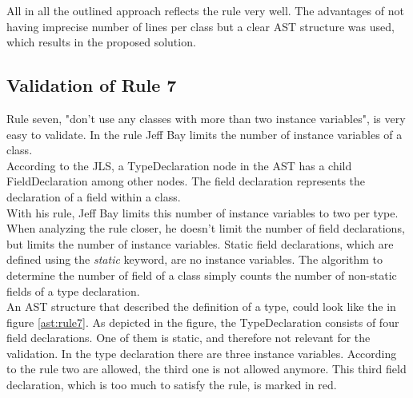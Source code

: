 All in all the outlined approach reflects the rule very well. The advantages of not having imprecise number of lines per class but a clear \acf{AST} structure was used, which results in the proposed solution.

\subsection*{Validation of Rule 7}
Rule seven, "don’t use any classes with more than two instance variables", is very easy to validate. In the rule Jeff Bay limits the number of instance variables of a class. 
\\

According to the \acf{JLS}, a TypeDeclaration node in the \acf{AST} has  a child FieldDeclaration among other nodes. The field declaration represents the declaration of a field within a class. 
\\

With his rule, Jeff Bay limits this number of instance variables to two per type. When analyzing the rule closer, he doesn't limit the number of field declarations, but limits the number of instance variables. Static field declarations, which are defined using the \textit{static} keyword, are no instance variables. The algorithm to determine the number of field of a class simply counts the number of non-static fields of a type declaration. 
\\

An \acf{AST} structure that described the definition of a type, could look like the in figure \ref{ast:rule7}. As depicted in the figure, the TypeDeclaration consists of four field declarations. One of them is static, and therefore not relevant for the validation. In the type declaration there are three instance variables. According to the rule two are allowed, the third one is not allowed anymore. This third field declaration, which is too much to satisfy the rule, is marked in red.
\\

\label{ast:rule7}

